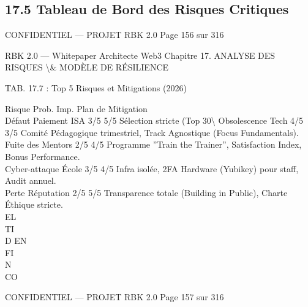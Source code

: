 \subsection{17.5 Tableau de Bord des Risques Critiques}
\vspace{0.5em}
\vspace{0.5em}
\vspace{0.5em}
\vspace{0.5em}
\begin{confidential}CONFIDENTIEL — PROJET RBK 2.0                                Page 156 sur 316\end{confidential}
RBK 2.0 — Whitepaper Architecte Web3                                        Chapitre 17. ANALYSE DES RISQUES \textbackslash{}& MODÈLE DE RÉSILIENCE\\
\vspace{0.5em}
\vspace{0.5em}
\vspace{0.5em}
\vspace{0.5em}
\begin{center}\begin{tabular}TAB. 17.7 : Top 5 Risques et Mitigations (2026)\end{tabular}\end{center}
\vspace{0.5em}
\vspace{0.5em}
Risque              Prob. Imp. Plan de Mitigation\\
Défaut Paiement ISA 3/5 5/5 Sélection stricte (Top 30\textbackslash{}%
Obsolescence Tech    4/5 3/5 Comité Pédagogique trimestriel, Track Agnostique (Focus Fundamentals).\\
Fuite des Mentors    2/5 4/5 Programme ”Train the Trainer”, Satisfaction Index, Bonus Performance.\\
Cyber-attaque École 3/5 4/5 Infra isolée, 2FA Hardware (Yubikey) pour staff, Audit annuel.\\
Perte Réputation     2/5 5/5 Transparence totale (Building in Public), Charte Éthique stricte.\\
\vspace{0.5em}
\vspace{0.5em}
\vspace{0.5em}
\vspace{0.5em}
EL\\
TI\\
D    EN\\
FI\\
N\\
CO\\
\vspace{0.5em}
\vspace{0.5em}
\vspace{0.5em}
\vspace{0.5em}
\begin{confidential}CONFIDENTIEL — PROJET RBK 2.0                               Page 157 sur 316\end{confidential}
